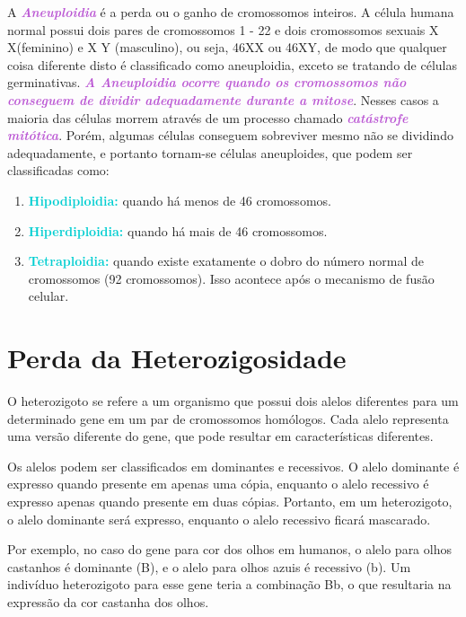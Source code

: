 \documentclass[11pt,a4paper]{article}
\newcounter{exemplo}
\begin{document}
	
	A \textcolor{MediumOrchid}{\textbf{\textit{Aneuploidia}}} é a perda ou o ganho de cromossomos inteiros. A célula humana normal possui dois pares de cromossomos 1 - 22 e dois cromossomos sexuais X  X(feminino) e X Y (masculino), ou seja, 46XX ou 46XY, de modo que qualquer coisa diferente disto é classificado como aneuploidia, exceto se tratando de células germinativas. \textcolor{MediumOrchid}{\textbf{\textit{A Aneuploidia ocorre quando os cromossomos não conseguem de dividir adequadamente durante a mitose}}}. Nesses casos a maioria das células morrem através de um processo chamado \textcolor{MediumOrchid}{\textbf{\textit{catástrofe mitótica}}}. Porém, algumas células conseguem sobreviver mesmo não se dividindo adequadamente, e portanto tornam-se células aneuploides, que podem ser classificadas como:

			\begin{enumerate}
				\item \textcolor{DarkTurquoise}{\textbf{Hipodiploidia:}} quando há menos de 46 cromossomos.
				\item \textcolor{DarkTurquoise}{\textbf{Hiperdiploidia:}}  quando há mais de 46 cromossomos.
				\item \textcolor{DarkTurquoise}{\textbf{Tetraploidia:}} quando existe exatamente o dobro do número normal de cromossomos (92 cromossomos). Isso acontece após o mecanismo de fusão celular.
			\end{enumerate}

\section{Perda da Heterozigosidade}

	O heterozigoto se refere a um organismo que possui dois alelos diferentes para um determinado gene em um par de cromossomos homólogos. Cada alelo representa uma versão diferente do gene, que pode resultar em características diferentes.

	Os alelos podem ser classificados em dominantes e recessivos. O alelo dominante é expresso quando presente em apenas uma cópia, enquanto o alelo recessivo é expresso apenas quando presente em duas cópias. Portanto, em um heterozigoto, o alelo dominante será expresso, enquanto o alelo recessivo ficará mascarado.

	Por exemplo, no caso do gene para cor dos olhos em humanos, o alelo para olhos castanhos é dominante (B), e o alelo para olhos azuis é recessivo (b). Um indivíduo heterozigoto para esse gene teria a combinação Bb, o que resultaria na expressão da cor castanha dos olhos.
	
\end{document}

